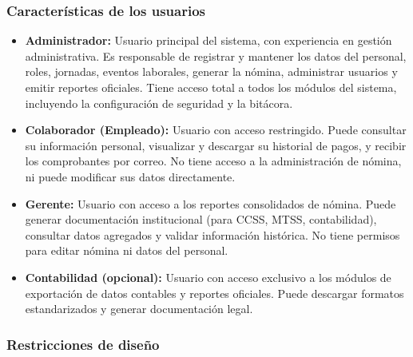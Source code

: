 \subsubsection*{Características de los usuarios}

\begin{itemize}
	\item \textbf{Administrador:} Usuario principal del sistema, con experiencia en gestión administrativa. Es responsable de registrar y mantener los datos del personal, roles, jornadas, eventos laborales, generar la nómina, administrar usuarios y emitir reportes oficiales. Tiene acceso total a todos los módulos del sistema, incluyendo la configuración de seguridad y la bitácora.

	\item \textbf{Colaborador (Empleado):} Usuario con acceso restringido. Puede consultar su información personal, visualizar y descargar su historial de pagos, y recibir los comprobantes por correo. No tiene acceso a la administración de nómina, ni puede modificar sus datos directamente.

	\item \textbf{Gerente:} Usuario con acceso a los reportes consolidados de nómina. Puede generar documentación institucional (para CCSS, MTSS, contabilidad), consultar datos agregados y validar información histórica. No tiene permisos para editar nómina ni datos del personal.

	\item \textbf{Contabilidad (opcional):} Usuario con acceso exclusivo a los módulos de exportación de datos contables y reportes oficiales. Puede descargar formatos estandarizados y generar documentación legal.
\end{itemize}

\subsubsection*{Restricciones de diseño}

